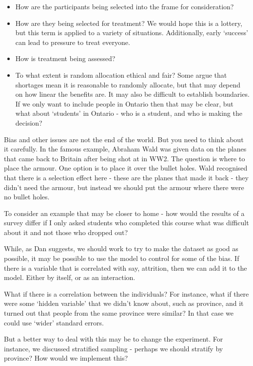 \documentclass[
]{book}
\providecommand{\tightlist}{%
  \setlength{\itemsep}{0pt}\setlength{\parskip}{0pt}}
\begin{document}
\begin{itemize}
\tightlist
\item
  How are the participants being selected into the frame for consideration?
\item
  How are they being selected for treatment? We would hope this is a lottery, but this term is applied to a variety of situations. Additionally, early `success' can lead to pressure to treat everyone.
\item
  How is treatment being assessed?
\item
  To what extent is random allocation ethical and fair? Some argue that shortages mean it is reasonable to randomly allocate, but that may depend on how linear the benefits are. It may also be difficult to establish boundaries. If we only want to include people in Ontario then that may be clear, but what about `students' in Ontario - who is a student, and who is making the decision?
\end{itemize}

Bias and other issues are not the end of the world. But you need to think about it carefully. In the famous example, Abraham Wald was given data on the planes that came back to Britain after being shot at in WW2. The question is where to place the armour. One option is to place it over the bullet holes. Wald recognised that there is a selection effect here - these are the planes that made it back - they didn't need the armour, but instead we should put the armour where there were no bullet holes.

To consider an example that may be closer to home - how would the results of a survey differ if I only asked students who completed this course what was difficult about it and not those who dropped out?

While, as Dan suggests, we should work to try to make the dataset as good as possible, it may be possible to use the model to control for some of the bias. If there is a variable that is correlated with say, attrition, then we can add it to the model. Either by itself, or as an interaction.

What if there is a correlation between the individuals? For instance, what if there were some `hidden variable' that we didn't know about, such as province, and it turned out that people from the same province were similar? In that case we could use `wider' standard errors.

But a better way to deal with this may be to change the experiment. For instance, we discussed stratified sampling - perhaps we should stratify by province? How would we implement this?
\end{document}
